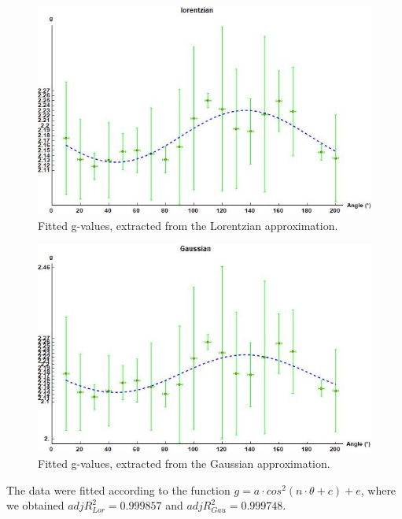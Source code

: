 \documentclass[openany,11pt,a4paper]{report}
\begin{document}
\begin{figure}[hbtp]
\centering
\includegraphics[scale=0.8]{glor1.jpg}
\caption{Fitted g-values, extracted from the Lorentzian approximation.}
\end{figure}




\begin{figure}[hbtp]
\centering
\includegraphics[scale=0.8]{ggau1.jpg}
\caption{Fitted g-values, extracted from the Gaussian approximation.}
\end{figure}

The data were fitted according to the function $g= a\cdot cos^{2}(n\cdot \theta + c) + e$, where we obtained $adj R^{2}_{Lor}=0.999857$ and $adj R^{2}_{Gau}=0.999748$.
\end{document}
